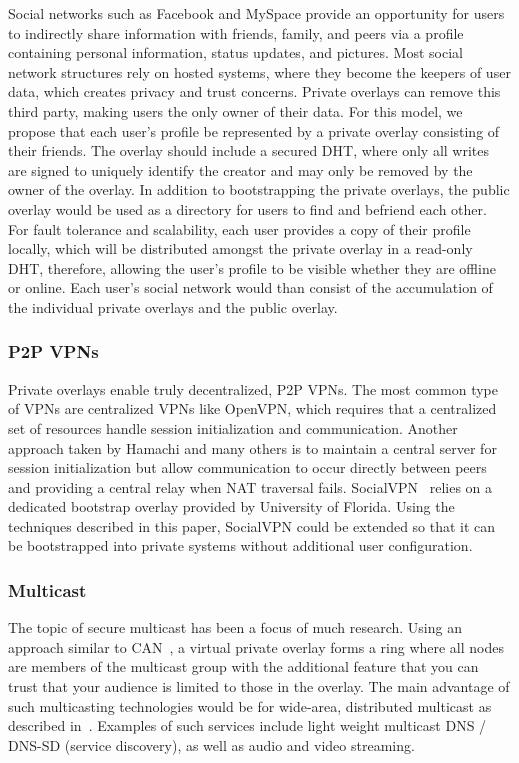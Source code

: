 \documentclass[conference]{IEEEtran}
\begin{document}
Social networks such as Facebook and MySpace provide an opportunity for users
to indirectly share information with friends, family, and peers via a profile
containing personal information, status updates, and pictures.  Most social
network structures rely on hosted systems, where they become the keepers of
user data, which creates privacy and trust concerns.  Private overlays can
remove this third party, making users the only owner of their data.  For this
model, we propose that each user's profile be represented by a private overlay
consisting of their friends.  The overlay should include a secured DHT, where
only all writes are signed to uniquely identify the creator and may only be
removed by the owner of the overlay.  In addition to bootstrapping the private
overlays, the public overlay would be used as a directory for users to find and
befriend each other.  For fault tolerance and scalability, each user provides a
copy of their profile locally, which will be distributed amongst the private
overlay in a read-only DHT, therefore, allowing the user's profile to be
visible whether they are offline or online.  Each user's social network would
than consist of the accumulation of the individual private overlays and the
public overlay.

\subsubsection{P2P VPNs}

Private overlays enable truly decentralized, P2P VPNs.  The most common type of
VPNs are centralized VPNs like OpenVPN, which requires that a centralized set
of resources handle session initialization and communication.  Another approach
taken by Hamachi and many others is to maintain a central server for session
initialization but allow communication to occur directly between peers and
providing a central relay when NAT traversal fails.  SocialVPN~\cite{socialvpn}
relies on a dedicated bootstrap overlay provided by University of Florida.
Using the techniques described in this paper, SocialVPN could be extended so
that it can be bootstrapped into private systems without additional user
configuration.

\subsubsection{Multicast}

The topic of secure multicast has been a focus of much research.  Using an
approach similar to CAN~\cite{can_multicast}, a virtual private overlay forms a
ring where all nodes are members of the multicast group with the additional
feature that you can trust that your audience is limited to those in the
overlay.  The main advantage of such multicasting technologies would be for
wide-area, distributed multicast as described in~\cite{from_peer}.  Examples of
such services include light weight multicast DNS / DNS-SD (service discovery),
as well as audio and video streaming.
\end{document}
